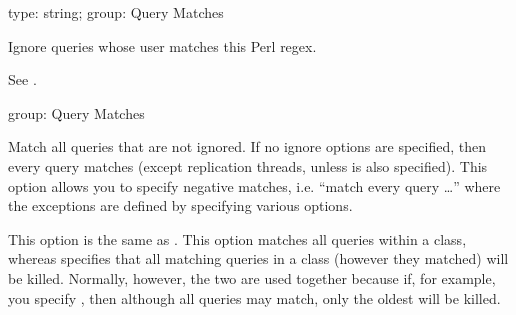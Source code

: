 \documentclass[letterpaper,10pt,english]{sphinxmanual}
\begin{document}
\begin{fulllineitems}
\label{\detokenize{mariadb-kill:cmdoption-mariadb-kill-ignore-user}}
\sphinxAtStartPar
type: string; group: Query Matches

\sphinxAtStartPar
Ignore queries whose user matches this Perl regex.

\sphinxAtStartPar
See {\hyperref[\detokenize{mariadb-kill:cmdoption-mariadb-kill-match-user}]{}}.

\end{fulllineitems}


\begin{fulllineitems}
\label{\detokenize{mariadb-kill:cmdoption-mariadb-kill-match-all}}
\sphinxAtStartPar
group: Query Matches

\sphinxAtStartPar
Match all queries that are not ignored.  If no ignore options are specified,
then every query matches (except replication threads, unless
{\hyperref[\detokenize{mariadb-kill:cmdoption-mariadb-kill-replication-threads}]{}} is also specified).  This option allows you to
specify negative matches, i.e. “match every query …” where the
exceptions are defined by specifying various  options.

\sphinxAtStartPar
This option is  the same as {\hyperref[\detokenize{mariadb-kill:cmdoption-mariadb-kill-victims}]{}} .  This option matches
all queries within a class, whereas {\hyperref[\detokenize{mariadb-kill:cmdoption-mariadb-kill-victims}]{}}  specifies that all
matching queries in a class (however they matched) will be killed.  Normally,
however, the two are used together because if, for example, you specify
{\hyperref[\detokenize{mariadb-kill:cmdoption-mariadb-kill-victims}]{}} , then although all queries may match, only the oldest
will be killed.

\end{fulllineitems}
\end{document}
